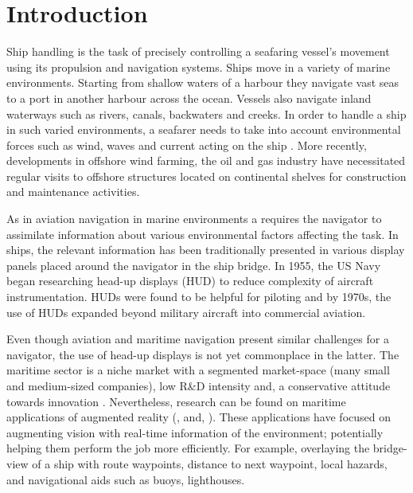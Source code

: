 \chapter{Introduction}

Ship handling is the task of precisely controlling a seafaring vessel’s movement using its propulsion and navigation systems. Ships move in a variety of marine environments. Starting from shallow waters of a harbour they navigate vast seas to a port in another harbour across the ocean. Vessels also navigate inland waterways such as rivers, canals, backwaters and creeks. In order to handle a ship in such varied environments, a seafarer needs to take into account environmental forces such as wind, waves and current acting on the ship \parencite{wiki:seamanship}. More recently, developments in offshore wind farming, the oil and gas industry have necessitated regular visits to offshore structures located on continental shelves for construction and maintenance activities. 

As in aviation navigation in marine environments a requires the navigator to assimilate information about various environmental factors affecting the task. In ships, the relevant information has been traditionally presented in various display panels placed around the navigator in the ship bridge. In 1955, the US Navy began researching head-up displays (HUD) to reduce complexity of aircraft instrumentation. HUDs were found to be helpful for piloting and by 1970s, the use of HUDs expanded beyond military aircraft into commercial aviation.

Even though aviation and maritime navigation present similar challenges for a navigator, the use of head-up displays is not yet commonplace in the latter. The maritime sector is a niche market with a segmented market-space (many small and medium-sized companies), low R\&D intensity and, a conservative attitude towards innovation \parencite{von2014maritime}. Nevertheless, research can be found on maritime applications of augmented reality (\cite{hugues2010experimental}, \cite{vasiljevic2011augmented} and, \cite{von2014maritime}). These applications have focused on augmenting vision with real-time information of the environment; potentially helping them perform the job more efficiently. For example, overlaying the bridge-view of a ship with route waypoints, distance to next waypoint, local hazards, and navigational aids such as buoys, lighthouses. 

